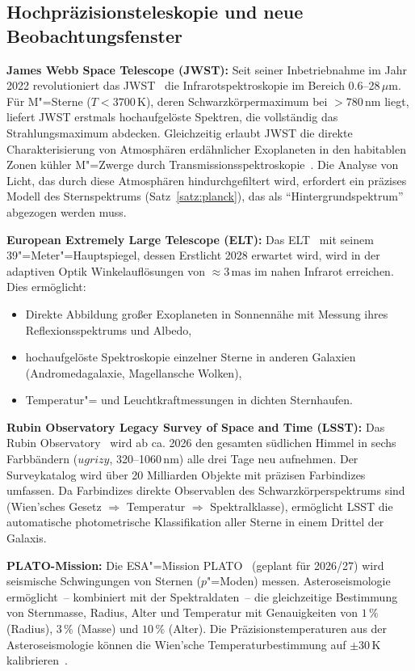 ﻿\documentclass[a4paper,12pt]{article}
\theoremstyle{definition}
\begin{document}
\subsection{Hochpräzisionsteleskopie und neue Beobachtungsfenster}

\textbf{James Webb Space Telescope (JWST):}
Seit seiner Inbetriebnahme im Jahr 2022 revolutioniert das
JWST~\cite{gardner2006} die Infrarotspektroskopie im Bereich 0.6--28\,$\mu$m.
Für M"=Sterne ($T < 3700\,\text{K}$), deren Schwarzkörpermaximum
bei $> 780\,\text{nm}$ liegt, liefert JWST erstmals hochaufgelöste
Spektren, die vollständig das Strahlungsmaximum abdecken.
Gleichzeitig erlaubt JWST die direkte Charakterisierung von Atmosphären
erdähnlicher Exoplaneten in den habitablen Zonen kühler M"=Zwerge
durch Transmissionsspektroskopie~\cite{lustigyaeger2022}.
Die Analyse von Licht, das durch diese Atmosphären hindurchgefiltert wird,
erfordert ein präzises Modell des Sternspektrums (Satz~\ref{satz:planck}),
das als ``Hintergrundspektrum'' abgezogen werden muss.

\textbf{European Extremely Large Telescope (ELT):}
Das ELT~\cite{gilmozzi2007} mit seinem 39"=Meter"=Hauptspiegel, dessen
Erstlicht 2028 erwartet wird, wird in der adaptiven Optik Winkelauflösungen
von $\approx 3\,\text{mas}$ im nahen Infrarot erreichen. Dies ermöglicht:
\begin{itemize}
    \item Direkte Abbildung großer Exoplaneten in Sonnennähe mit Messung
          ihres Reflexionsspektrums und Albedo,
    \item hochaufgelöste Spektroskopie einzelner Sterne in anderen Galaxien
          (Andromedagalaxie, Magellansche Wolken),
    \item Temperatur"= und Leuchtkraftmessungen in dichten Sternhaufen.
\end{itemize}

\textbf{Rubin Observatory Legacy Survey of Space and Time (LSST):}
Das Rubin Observatory~\cite{ivezic2019} wird ab ca. 2026 den gesamten
südlichen Himmel in sechs Farbbändern ($ugrizy$, 320--1060\,nm) alle
drei Tage neu aufnehmen. Der Surveykatalog wird über 20 Milliarden Objekte
mit präzisen Farbindizes umfassen. Da Farbindizes direkte Observablen
des Schwarzkörperspektrums sind (Wien'sches Gesetz $\Rightarrow$
Temperatur $\Rightarrow$ Spektralklasse), ermöglicht LSST die automatische
photometrische Klassifikation aller Sterne in einem Drittel der Galaxis.

\textbf{PLATO-Mission:}
Die ESA"=Mission PLATO~\cite{rauer2014} (geplant für 2026/27) wird
seismische Schwingungen von Sternen ($p$"=Moden) messen.
Asteroseismologie ermöglicht~-- kombiniert mit der Spektraldaten~-- die
gleichzeitige Bestimmung von Sternmasse, Radius, Alter und Temperatur
mit Genauigkeiten von $1\,\%$ (Radius), $3\,\%$ (Masse) und
$10\,\%$ (Alter). Die Präzisionstemperaturen aus der Asteroseismologie
können die Wien'sche Temperaturbestimmung auf $\pm 30\,\text{K}$
kalibrieren~\cite{chaplin2013}.
\end{document}
